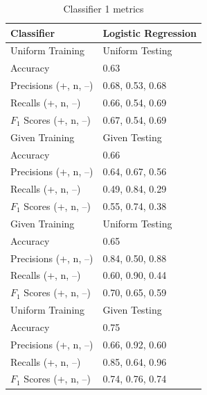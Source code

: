 \documentclass[11pt]{article}
\begin{document}
\begin{table}[H]
	\begin{center}
		\begin{tabular}{|l|l|}			
			\hline
			Classifier & Logistic Regression \\
			\hline\hline
			Uniform Training & Uniform Testing \\
			\hline
			Accuracy & 0.63 \\
			Precisions (+, n, --)	& 0.68, 0.53, 0.68 \\
			Recalls (+, n, --) 		& 0.66, 0.54, 0.69 \\
			$F_1$ Scores (+, n, --) & 0.67, 0.54, 0.69 \\
			\hline\hline
			Given Training & Given Testing \\
			\hline
			Accuracy & 0.66 \\
			Precisions (+, n, --) 	& 0.64, 0.67, 0.56 \\
			Recalls (+, n, --) 		& 0.49, 0.84, 0.29 \\
			$F_1$ Scores (+, n, --) & 0.55, 0.74, 0.38 \\
			\hline\hline
			Given Training & Uniform Testing \\
			\hline
			Accuracy & 0.65 \\
			Precisions (+, n, --) 	& 0.84, 0.50, 0.88 \\
			Recalls (+, n, --) 		& 0.60, 0.90, 0.44 \\
			$F_1$ Scores (+, n, --) & 0.70, 0.65, 0.59 \\
			\hline\hline
			Uniform Training & Given Testing \\
			\hline
			Accuracy & 0.75 \\
			Precisions (+, n, --) 	& 0.66, 0.92, 0.60 \\
			Recalls (+, n, --) 		& 0.85, 0.64, 0.96 \\
			$F_1$ Scores (+, n, --) & 0.74, 0.76, 0.74 \\
			\hline
		\end{tabular}
		\caption{Classifier 1 metrics}
		\label{tbl:metrics-1st10000}
	\end{center}
\end{table}

\end{document}
